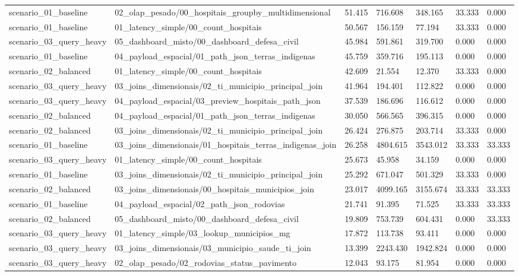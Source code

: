 {\begin{longtable}{p{}p{}p{}p{}p{}p{}p{}}
scenario\_01\_baseline & 02\_olap\_pesado/00\_hospitais\_groupby\_multidimensional & 51.415 & 716.608 & 348.165 & 33.333 & 0.000 \\
scenario\_01\_baseline & 01\_latency\_simple/00\_count\_hospitais & 50.567 & 156.159 & 77.194 & 33.333 & 0.000 \\
scenario\_03\_query\_heavy & 05\_dashboard\_misto/00\_dashboard\_defesa\_civil & 45.984 & 591.861 & 319.700 & 0.000 & 0.000 \\
scenario\_01\_baseline & 04\_payload\_espacial/01\_path\_json\_terras\_indigenas & 45.759 & 359.716 & 195.113 & 0.000 & 0.000 \\
scenario\_02\_balanced & 01\_latency\_simple/00\_count\_hospitais & 42.609 & 21.554 & 12.370 & 33.333 & 0.000 \\
scenario\_03\_query\_heavy & 03\_joins\_dimensionais/02\_ti\_municipio\_principal\_join & 41.964 & 194.401 & 112.822 & 0.000 & 0.000 \\
scenario\_03\_query\_heavy & 04\_payload\_espacial/03\_preview\_hospitais\_path\_json & 37.539 & 186.696 & 116.612 & 0.000 & 0.000 \\
scenario\_02\_balanced & 04\_payload\_espacial/01\_path\_json\_terras\_indigenas & 30.050 & 566.565 & 396.315 & 0.000 & 0.000 \\
scenario\_02\_balanced & 03\_joins\_dimensionais/02\_ti\_municipio\_principal\_join & 26.424 & 276.875 & 203.714 & 33.333 & 0.000 \\
scenario\_01\_baseline & 03\_joins\_dimensionais/01\_hospitais\_terras\_indigenas\_join & 26.258 & 4804.615 & 3543.012 & 33.333 & 33.333 \\
scenario\_03\_query\_heavy & 01\_latency\_simple/00\_count\_hospitais & 25.673 & 45.958 & 34.159 & 0.000 & 0.000 \\
scenario\_01\_baseline & 03\_joins\_dimensionais/02\_ti\_municipio\_principal\_join & 25.292 & 671.047 & 501.329 & 33.333 & 0.000 \\
scenario\_02\_balanced & 03\_joins\_dimensionais/00\_hospitais\_municipios\_join & 23.017 & 4099.165 & 3155.674 & 33.333 & 33.333 \\
scenario\_01\_baseline & 04\_payload\_espacial/02\_path\_json\_rodovias & 21.741 & 91.395 & 71.525 & 33.333 & 33.333 \\
scenario\_02\_balanced & 05\_dashboard\_misto/00\_dashboard\_defesa\_civil & 19.809 & 753.739 & 604.431 & 0.000 & 33.333 \\
scenario\_03\_query\_heavy & 01\_latency\_simple/03\_lookup\_municipios\_mg & 17.872 & 113.738 & 93.411 & 0.000 & 0.000 \\
scenario\_03\_query\_heavy & 03\_joins\_dimensionais/03\_municipio\_saude\_ti\_join & 13.399 & 2243.430 & 1942.824 & 0.000 & 0.000 \\
scenario\_03\_query\_heavy & 02\_olap\_pesado/02\_rodovias\_status\_pavimento & 12.043 & 93.175 & 81.954 & 0.000 & 0.000 \\
\bottomrule
\end{longtable}
}
